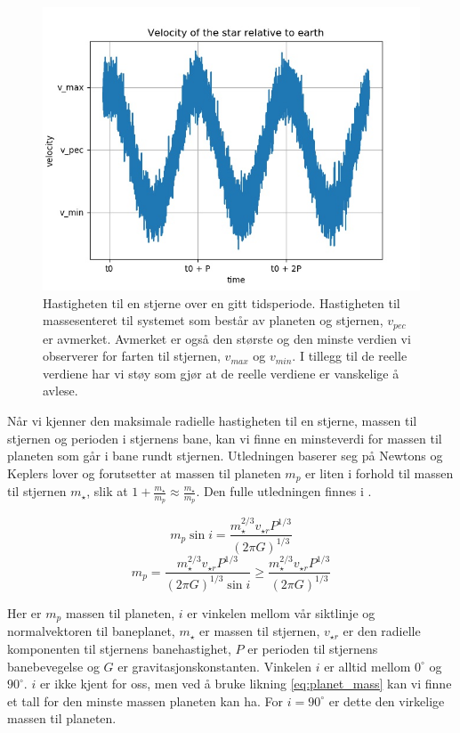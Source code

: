 \documentclass[english,notitlepage]{revtex4-1}  %
\begin{document}
\begin{figure}
  \includegraphics[width=\linewidth]{../output/plots/theoretical_star_vel.jpg}
  \caption{Hastigheten til en stjerne over en gitt tidsperiode. Hastigheten til massesenteret til systemet som består av planeten og stjernen, $v_{pec}$ er avmerket. Avmerket er også den største og den minste verdien vi observerer for farten til stjernen, $v_{max}$ og $v_{min}$. I tillegg til de reelle verdiene har vi støy som gjør at de reelle verdiene er vanskelige å avlese.}
  \label{fig:theoretical_star_vel}
\end{figure}

Når vi kjenner den maksimale radielle hastigheten til en stjerne, massen til stjernen og
 perioden i stjernens bane, kan vi finne en minsteverdi for massen til planeten som går i bane rundt stjernen. Utledningen baserer seg på Newtons og Keplers lover og forutsetter at massen til planeten $m_p$ er liten i forhold til massen til stjernen $m_\star$, slik at $1 + \frac{m_\star}{m_p} \approx \frac{m_\star}{m_p}$. Den fulle utledningen finnes i \citep{part1C}.

\begin{equation*}
  m_p \sin{i} = \frac{m_\star^{2/3} v_{\star r} P^{1/3}}{(2 \pi G)^{1/3}}
\end{equation*}
\begin{equation}
  \label{eq:planet_mass}
  m_p = \frac{m_\star^{2/3} v_{\star r} P^{1/3}}{(2 \pi G)^{1/3} \sin{i}} \geq \frac{m_\star^{2/3} v_{\star r} P^{1/3}}{(2 \pi G)^{1/3}}
\end{equation}

Her er $m_p$ massen til planeten, $i$ er vinkelen mellom vår siktlinje og normalvektoren
 til baneplanet, $m_\star$ er massen til stjernen, $v_{\star r}$ er den radielle komponenten til stjernens banehastighet, $P$ er perioden til stjernens banebevegelse og $G$ er gravitasjonskonstanten. Vinkelen $i$ er alltid mellom $0^\circ$ og $90^\circ$. $i$ er ikke kjent for oss, men ved å bruke likning \ref{eq:planet_mass} kan vi finne et tall for den minste massen planeten kan ha. For $i = 90^\circ$ er dette den virkelige massen til planeten.
\end{document}
